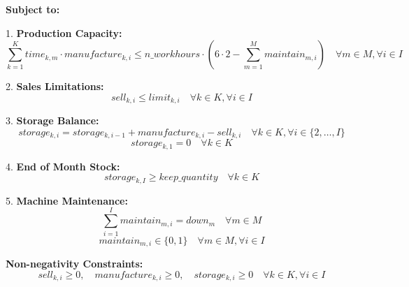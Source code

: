 \documentclass{article}
\begin{document}
\textbf{Subject to:}

1. \textbf{Production Capacity:}
\[
\sum_{k=1}^{K} time_{k,m} \cdot manufacture_{k,i} \leq n\_workhours \cdot (6 \cdot 2 - \sum_{m=1}^{M} maintain_{m,i}) \quad \forall m \in M, \forall i \in I
\]

2. \textbf{Sales Limitations:}
\[
sell_{k,i} \leq limit_{k,i} \quad \forall k \in K, \forall i \in I
\]

3. \textbf{Storage Balance:}
\[
storage_{k,i} = storage_{k,i-1} + manufacture_{k,i} - sell_{k,i} \quad \forall k \in K, \forall i \in \{2,\ldots,I\}
\]
\[
storage_{k,1} = 0 \quad \forall k \in K
\]

4. \textbf{End of Month Stock:}
\[
storage_{k,I} \geq keep\_quantity \quad \forall k \in K
\]

5. \textbf{Machine Maintenance:}
\[
\sum_{i=1}^{I} maintain_{m,i} = down_m \quad \forall m \in M
\]
\[
maintain_{m,i} \in \{0, 1\} \quad \forall m \in M, \forall i \in I
\]

\textbf{Non-negativity Constraints:}
\[
sell_{k,i} \geq 0, \quad manufacture_{k,i} \geq 0, \quad storage_{k,i} \geq 0 \quad \forall k \in K, \forall i \in I
\]
\end{document}
